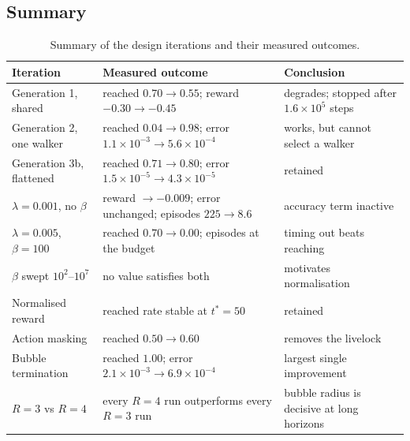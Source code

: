 \subsection{Summary}
\label{sec:rl_record_summary}

\begin{table}[htbp]
\centering
\small
\begin{tabular}{@{}p{3.4cm}p{4.1cm}p{6.4cm}@{}}
\toprule
Iteration & Measured outcome & Conclusion \\
\midrule
Generation 1, shared
  & reached $0.70 \to 0.55$; reward $-0.30 \to -0.45$
  & degrades; stopped after $1.6\times10^5$ steps \\
Generation 2, one walker
  & reached $0.04 \to 0.98$; error $1.1\times10^{-3} \to 5.6\times10^{-4}$
  & works, but cannot select a walker \\
Generation 3b, flattened
  & reached $0.71 \to 0.80$; error $1.5\times10^{-5} \to 4.3\times10^{-5}$
  & retained \\
\midrule
$\lambda = 0.001$, no $\beta$
  & reward $\to -0.009$; error unchanged; episodes $225 \to 8.6$
  & accuracy term inactive \\
$\lambda = 0.005$, $\beta = 100$
  & reached $0.70 \to 0.00$; episodes at the budget
  & timing out beats reaching \\
$\beta$ swept $10^2$--$10^7$
  & no value satisfies both
  & motivates normalisation \\
Normalised reward
  & reached rate stable at $t^* = 50$
  & retained \\
\midrule
Action masking
  & reached $0.50 \to 0.60$
  & removes the livelock \\
Bubble termination
  & reached $1.00$; error $2.1\times10^{-3} \to 6.9\times10^{-4}$
  & largest single improvement \\
\midrule
$R = 3$ vs $R = 4$
  & every $R = 4$ run outperforms every $R = 3$ run
  & bubble radius is decisive at long horizons \\
\bottomrule
\end{tabular}
\caption{Summary of the design iterations and their measured outcomes.}
\label{tab:rl_ledger}
\end{table}
